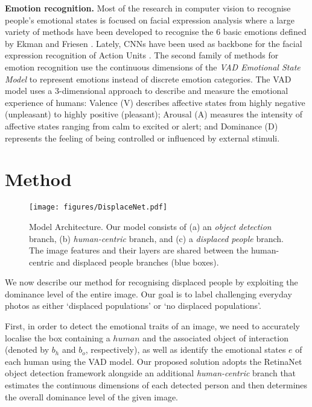 \documentclass[10pt,twocolumn,letterpaper]{article}
\begin{document}
\noindent
\textbf{Emotion recognition.} Most of the research in computer vision to recognise people’s emotional states is focused on facial expression analysis \cite{fabian2016emotionet,eleftheriadis2016joint} where a large variety of methods have been developed to recognise the 6 basic emotions defined by Ekman and Friesen \cite{ekman1971constants}. Lately, CNNs have been used as backbone for the facial expression recognition of Action Units \cite{fabian2016emotionet}. The second family of methods for emotion recognition use the continuous dimensions of the \textit{VAD Emotional State Model} \cite{mehrabian1995framework,mehrabian1974approach} to represent emotions instead of discrete emotion categories. The VAD model uses a 3-dimensional approach to describe and measure the emotional experience of humans: Valence (V) describes affective states from highly negative (unpleasant) to highly positive (pleasant); Arousal (A) measures the intensity of affective states ranging from calm to excited or alert; and Dominance (D) represents the feeling of being controlled or influenced by external stimuli.



\section{Method}

\begin{figure}[t!]
	\centering
	
	\texttt{[image: figures/DisplaceNet.pdf]} 
	\caption{Model Architecture. Our model consists of (a) an \textit{object detection} branch, (b) \textit{human-centric} branch, and (c) a \textit{displaced people} branch. The image features and their layers are shared between the human-centric and displaced people branches (blue boxes).}
	\label{Fig. 2}
\end{figure}

We now describe our method for recognising displaced people by exploiting the dominance level of the entire image. Our goal is to label challenging everyday photos as either `displaced populations' or `no displaced populations'.  

First, in order to detect the emotional traits of an image, we need to accurately localise the box containing a $human$ and the associated object of interaction (denoted by $b_h$ and $b_o$, respectively), as well as identify the emotional states $e$ of each human using the VAD model. Our proposed solution adopts the RetinaNet \cite{lin2018focal} object detection framework alongside an additional \textit{human-centric} branch that estimates the continuous dimensions of each detected person and then determines the overall dominance level of the given image. 
\end{document}
